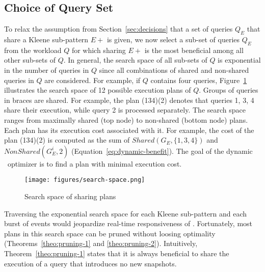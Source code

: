 
\subsection{Choice of Query Set}
\label{sec:queries}

To relax the assumption from Section~\ref{sec:decisions} that a set of queries $Q_E$ that share a Kleene sub-pattern $E+$ is given, we now select a sub-set of queries $Q_E$ from the workload $Q$ for which sharing $E+$ is the most beneficial among all other sub-sets of $Q$.
%
In general, the search space of all sub-sets of $Q$ is exponential in the number of queries in $Q$ since all combinations of shared and non-shared queries in $Q$ are considered. 
For example, if $Q$ contains four queries, Figure~\ref{fig:search-space} illustrates the search space of 12 possible execution plans of $Q$. 
Groups of queries in braces are shared. For example, the plan (134)(2) denotes that queries 1, 3, 4 share their execution, while query 2 is processed separately.
The search space ranges from maximally shared (top node) to non-shared (bottom node) plans. 
Each plan has its execution cost associated with it. For example, the cost of the plan (134)(2) is computed as the sum of $Shared(G_E,\{1,3,4\})$ and $NonShared(G_E^i,2)$ (Equation~\ref{eq:dynamic-benefit}). 
The goal of the dynamic \app\ optimizer is to find a plan with minimal execution cost.

\begin{figure}[!htb]
\centering
\texttt{[image: figures/search-space.png]}
\caption{Search space of sharing plans}
\label{fig:search-space}
\end{figure}

Traversing the exponential search space for each Kleene sub-pattern and each burst of events would jeopardize real-time responsiveness of \app. Fortunately, most plans in this search space can be pruned without loosing optimality  (Theorems~\ref{theo:pruning-1} and \ref{theo:pruning-2}). 
Intuitively, Theorem~\ref{theo:pruning-1} states that it is always beneficial to share the execution of a query that introduces no new snapshots.

